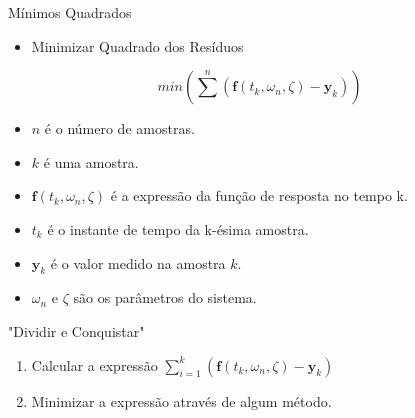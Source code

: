 \begin{frame}[t]{Mínimos Quadrados}
	\begin{itemize}
	\item Minimizar Quadrado dos Resíduos
	\end{itemize}\pause
	\begin{equation}
min(\sum^n (\mathbf{f}(t_k,\omega_n,\zeta)-\mathbf{y}_k))
\end{equation}\pause
\begin{itemize}
	\item $n$ é o número de amostras.\pause
	\item $k$ é uma amostra.\pause
	\item $\mathbf{f}(t_k,\omega_n,\zeta)$ é a expressão da função de resposta no tempo k.\pause
	\item $t_k$ é o instante de tempo da k-ésima amostra.\pause
	\item $\mathbf{y}_k$ é o valor medido na amostra $k$.\pause
	\item $\omega_n$ e $\zeta$ são os parâmetros do sistema.
	\note<8>{ZETA}
	\end{itemize}
\end{frame}

\begin{frame}[t]{"Dividir e Conquistar"}
\begin{enumerate}
\item<1-2> Calcular a expressão $\sum_{i=1}^k (\mathbf{f}(t_k,\omega_n,\zeta)-\mathbf{y}_k)$\pause
\item<2> Minimizar a expressão através de algum método.
\end{enumerate}
\end{frame}